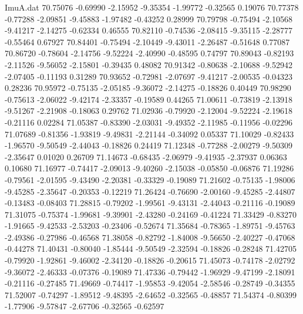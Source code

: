\begin{filecontents}{ImuA.dat}
  70.75076   -0.69990   -2.15952   -9.35354   -1.99772   -0.32565    0.19076
  70.77378   -0.77288   -2.09851   -9.45883   -1.97482   -0.43252    0.28999
  70.79798   -0.75494   -2.10568   -9.41217   -2.14275   -0.62334    0.46555
  70.82110   -0.74536   -2.08415   -9.35115   -2.28777   -0.55464    0.67927
  70.84401   -0.75494   -2.10449   -9.43011   -2.26487   -0.51648    0.77087
  70.86720   -0.78604   -2.14756   -9.52224   -2.40990   -0.48595    0.74797
  70.89043   -0.82193   -2.11526   -9.56052   -2.15801   -0.39435    0.48082
  70.91342   -0.80638   -2.10688   -9.52942   -2.07405   -0.11193    0.31289
  70.93652   -0.72981   -2.07697   -9.41217   -2.00535   -0.04323    0.28236
  70.95972   -0.75135   -2.05185   -9.36072   -2.14275   -0.18826    0.40449
  70.98290   -0.75613   -2.06022   -9.42174   -2.33357   -0.19589    0.44265
  71.00611   -0.73819   -2.13918   -9.51267   -2.21908   -0.18063    0.29762
  71.02936   -0.79920   -2.12004   -9.52224   -2.19618   -0.21116    0.02284
  71.05387   -0.83390   -2.03031   -9.49352   -2.11985   -0.11956   -0.02296
  71.07689   -0.81356   -1.93819   -9.49831   -2.21144   -0.34092    0.05337
  71.10029   -0.82433   -1.96570   -9.50549   -2.44043   -0.18826    0.24419
  71.12348   -0.77288   -2.00279   -9.50309   -2.35647    0.01020    0.26709
  71.14673   -0.68435   -2.06979   -9.41935   -2.37937    0.06363    0.10680
  71.16977   -0.74417   -2.09013   -9.40260   -2.15038   -0.05850   -0.06876
  71.19286   -0.79561   -2.01595   -9.43490   -2.20381   -0.33329   -0.19089
  71.21602   -0.75135   -1.98006   -9.45285   -2.35647   -0.20353   -0.12219
  71.26424   -0.76690   -2.00160   -9.45285   -2.44807   -0.13483   -0.08403
  71.28815   -0.79202   -1.99561   -9.43131   -2.44043   -0.21116   -0.19089
  71.31075   -0.75374   -1.99681   -9.39901   -2.43280   -0.24169   -0.41224
  71.33429   -0.83270   -1.91665   -9.42533   -2.53203   -0.23406   -0.52674
  71.35684   -0.78365   -1.89751   -9.45763   -2.49386   -0.27986   -0.46568
  71.38058   -0.82792   -1.84008   -9.56650   -2.40227   -0.47068   -0.44278
  71.40431   -0.80040   -1.85444   -9.50549   -2.32594   -0.18826   -0.28248
  71.42705   -0.79920   -1.92861   -9.46002   -2.34120   -0.18826   -0.20615
  71.45073   -0.74178   -2.02792   -9.36072   -2.46333   -0.07376   -0.19089
  71.47336   -0.79442   -1.96929   -9.47199   -2.18091   -0.21116   -0.27485
  71.49669   -0.74417   -1.95853   -9.42054   -2.58546   -0.28749   -0.34355
  71.52007   -0.74297   -1.89512   -9.48395   -2.64652   -0.32565   -0.48857
  71.54374   -0.80399   -1.77906   -9.57847   -2.67706   -0.32565   -0.62597

\end{filecontents}
